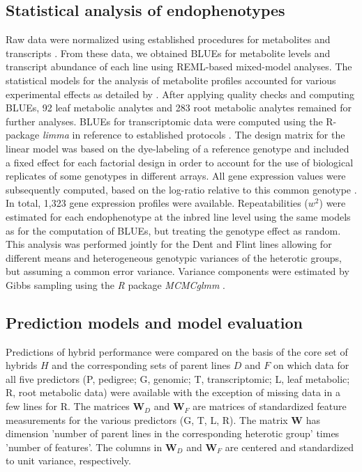 \documentclass[12pt,titlepage]{article}
\begin{document}
\subsection{Statistical analysis of endophenotypes}
Raw data were normalized using established procedures for metabolites
\cite{VandenBerg2006} and transcripts \cite{Smyth2003,Ritchie2007}.
From these data, we obtained BLUEs for metabolite levels and transcript 
abundance of each line using REML-based mixed-model analyses.
The statistical models for the analysis of metabolite profiles accounted for 
various experimental effects as detailed by .
After applying quality checks and computing BLUEs, 92 leaf metabolic analytes 
and 283 root metabolic analytes remained for further analyses.
BLUEs for transcriptomic data were computed using the R-package \emph{limma} 
\cite{Ritchie2015a} in reference to established protocols 
\cite{Smyth2003,Ritchie2007,Frisch2010}.
The design matrix for the linear model was based on the dye-labeling of a 
reference genotype and included a fixed effect for each factorial design 
in order to account for the use of biological replicates of some genotypes in 
different arrays. 
All gene expression values were subsequently computed, based on the log-ratio 
relative to this common genotype \cite{Smyth2004}.
In total, 1,323 gene expression profiles were available.
Repeatabilities ($w^2$) were estimated for each endophenotype at the inbred line 
level using the same models as for the computation of BLUEs, but treating the 
genotype effect as random.
This analysis was performed jointly for the Dent and Flint lines allowing for
different means and heterogeneous genotypic variances of the heterotic groups,
but assuming a common error variance.
Variance components were estimated by Gibbs sampling using the \emph{R} package
\emph{MCMCglmm} \cite{Hadfield2010}.




\subsection{Prediction models and model evaluation}
Predictions of hybrid performance were compared on the basis of the core set
of hybrids $H$ and the corresponding sets of parent lines $D$ and $F$ on which
data for all five predictors (P, pedigree; G, genomic; T, transcriptomic; L,
leaf metabolic; R, root metabolic data) were available with the exception of
missing data in a few lines for R.
The matrices $\mathbf{W}_{D}$ and $\mathbf{W}_{F}$ are matrices of standardized 
feature measurements for the various predictors (G, T, L, R).
The matrix $\mathbf{W}$ has dimension 'number of parent lines in the 
corresponding heterotic group' times 'number of features'.
The columns in $\mathbf{W}_{D}$ and $\mathbf{W}_{F}$ are centered and
standardized to unit variance, respectively.
\end{document}
